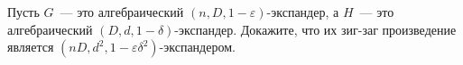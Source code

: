 Пусть $G$~--- это алгебраический $(n, D, 1 - \varepsilon)$-экспандер, а $H$~--- это алгебраический $(D, d, 1 -
\delta)$-экспандер. Докажите, что их зиг-заг произведение является $(nD, d^2, 1 - \varepsilon \delta^2)$-экспандером.